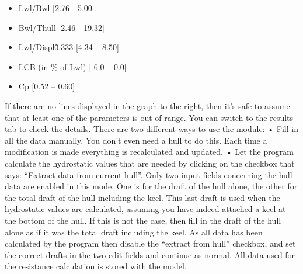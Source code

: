 \documentclass[12pt]{article}
\begin{document}
\begin{itemize}
  \item Lwl/Bwl [2.76 - 5.00]
  \item Bwl/Thull [2.46 - 19.32]
  \item Lwl/Displ\^0.333 [4.34 – 8.50]
  \item LCB (in \% of Lwl) [-6.0 – 0.0]
  \item Cp [0.52 – 0.60]
\end{itemize}

If there are no lines displayed in the graph to the right, then it's safe to assume that at least one of
the parameters is out of range. You can switch to the results tab to check the details.
There are two different ways to use the module:
• Fill in all the data manually. You don't even need a hull to do this. Each time a modification is
made everything is recalculated and updated.
• Let the program calculate the hydrostatic values that are needed by clicking on the checkbox that
says: “Extract data from current hull”. Only two input fields concerning the hull data are enabled
in this mode. One is for the draft of the hull alone, the other for the total draft of the hull including
the keel. This last draft is used when the hydrostatic values are calculated, assuming you have
indeed attached a keel at the bottom of the hull. If this is not the case, then fill in the draft of the
hull alone as if it was the total draft including the keel. As all data has been calculated by the
program then disable the “extract from hull” checkbox, and set the correct drafts in the two edit
fields and continue as normal.
All data used for the resistance calculation is stored with the model.
\end{document}
